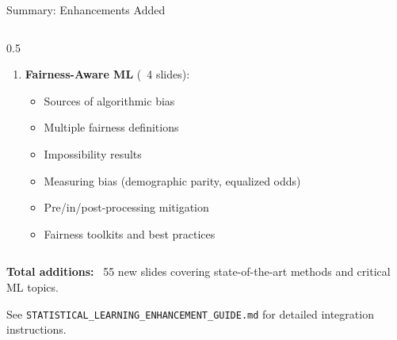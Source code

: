 \begin{frame}{Summary: Enhancements Added}
\begin{columns}
\begin{column}{0.5\textwidth}
\begin{enumerate}
\item \textbf{Fairness-Aware ML} (~4 slides):
   \begin{itemize}
   \item Sources of algorithmic bias
   \item Multiple fairness definitions
   \item Impossibility results
   \item Measuring bias (demographic parity, equalized odds)
   \item Pre/in/post-processing mitigation
   \item Fairness toolkits and best practices
   \end{itemize}
\end{enumerate}
\end{column}
\end{columns}

\vspace{0.5cm}
\textbf{Total additions:} ~55 new slides covering state-of-the-art methods and critical ML topics.

\vspace{0.3cm}
See \texttt{STATISTICAL\_LEARNING\_ENHANCEMENT\_GUIDE.md} for detailed integration instructions.
\end{frame}


